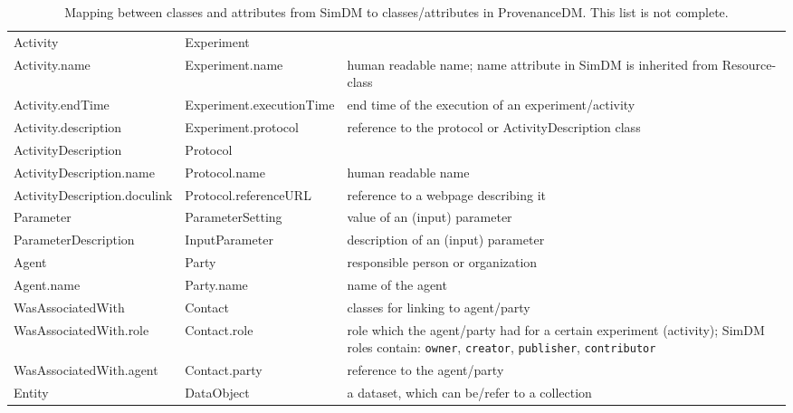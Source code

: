 \begin{table}[h]
\small
{}\textwidth
\begin{tabulary}{1.0\textwidth}{@{}Llp{5cm}@{}}
\toprule
{} &  & \\
\midrule
Activity               & Experiment      &  \\
Activity.name          & Experiment.name & human readable name; name attribute in SimDM is inherited from Resource-class\\
Activity.endTime & Experiment.executionTime  & end time of the execution of an experiment/activity \\
Activity.description & Experiment.protocol & reference to the protocol or ActivityDescription class \\
ActivityDescription    & Protocol        & \\
ActivityDescription.name  & Protocol.name   & human readable name\\
ActivityDescription.doculink & Protocol.referenceURL & reference to a webpage describing it\\
Parameter              & ParameterSetting     & value of an (input) parameter\\
ParameterDescription   & InputParameter       & description of an (input) parameter\\
Agent           & Party           & responsible person or organization\\
Agent.name      & Party.name      & name of the agent \\
WasAssociatedWith & Contact         & classes for linking to agent/party\\
WasAssociatedWith.role & Contact.role    & role which the agent/party had for a certain experiment (activity); SimDM roles contain: \texttt{owner}, \texttt{creator}, \texttt{publisher}, \texttt{contributor}\\
WasAssociatedWith.agent & Contact.party    & reference to the agent/party \\
Entity        & DataObject     & a dataset, which can be/refer to a collection\\

\bottomrule
\end{tabulary}
\caption[Mapping between classes and attributes from SimDM to classes/attributes in ProvenanceDM]{Mapping between classes and attributes from SimDM to classes/attributes in ProvenanceDM. This list is not complete.}
\label{tab:simdmmapping}
\end{table}

